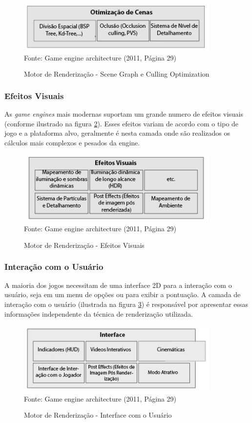\documentclass[12pt,	openright, twoside,	a4paper, english, french, spanish, brazil]{abntex2}
\begin{document}
\begin{figure}[H]
\centering
\caption{Motor de Renderização - Scene Graph e Culling Optimization}
\includegraphics[width=10cm]{imagens/arch-scene.png}
\\
\small{Fonte: Game engine architecture (2011, Página 29)}
\label{figura:arch_scene}
\end{figure}

\subsubsection{Efeitos Visuais}
As \textit{game engines} mais modernas suportam um grande numero de efeitos visuais (conforme ilustrado na figura \ref{figura:arch-visual}). Esses efeitos variam de acordo com o tipo de jogo e a plataforma alvo, geralmente é nesta camada onde são realizados os cálculos mais complexos e pesados da engine.

\begin{figure}[H]
\centering
\caption{Motor de Renderização - Efeitos Visuais}
\includegraphics[width=10cm]{imagens/arch-visual.png}
\\
\small{Fonte: Game engine architecture (2011, Página 29)}
\label{figura:arch-visual}
\end{figure}

\subsubsection{Interação com o Usuário}
A maioria dos jogos necessitam de uma interface 2D para a interação com o usuário, seja em um menu de opções ou para exibir a pontuação. A camada de interação com o usuário (ilustrada na figura \ref{figura:arch_front}) é responsável por apresentar essas informações independente da técnica de renderização utilizada.

\begin{figure}[H]
\centering
\caption{Motor de Renderização - Interface com o Usuário}
\includegraphics[width=10cm]{imagens/arch-front.png}
\\
\small{Fonte: Game engine architecture (2011, Página 29)}
\label{figura:arch_front}
\end{figure}
\end{document}
